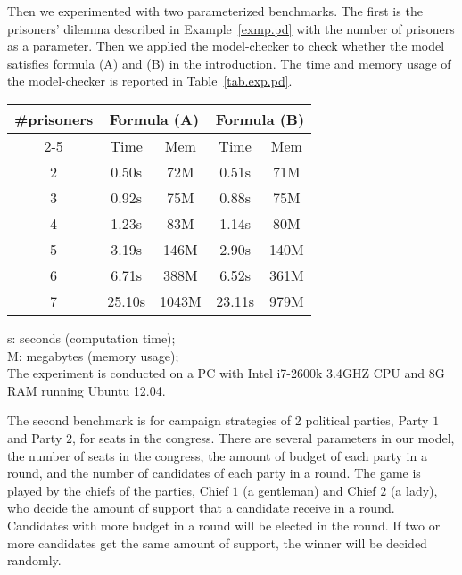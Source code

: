 \documentclass[11pt]{article}
\begin{document}
Then we experimented with two parameterized benchmarks.  
The first is the prisoners' dilemma described in Example~\ref{exmp.pd} 
with the number of prisoners as a parameter.  
Then we applied the model-checker to check whether the model  
satisfies formula (A) and (B) in the introduction.
The time and memory usage of the model-checker is reported in 
Table~\ref{tab.exp.pd}.
\begin{table*}[!th]
\caption{Experiment data for the prisoners' dilemma model}
\label{tab.exp.pd}
\begin{center}
\begin{tabular}{c||c|c||c|c} \hline
\multirow{2}{*}{\#prisoners}  &\multicolumn{2}{c||}{Formula (A)} & \multicolumn{2}{c}{Formula (B)}\\ \cline{2-5}
& Time & Mem  & Time & Mem\\ \hline
2 &0.50s &72M   &0.51s &71M \\
3 &0.92s &75M   &0.88s &75M \\
4 &1.23s &83M   &1.14s &80M \\
5 &3.19s &146M  &2.90s &140M \\
6 &6.71s &388M  &6.52s &361M \\
7 &25.10s&1043M &23.11s&979M \\ \hline
\end{tabular}
\hspace*{10mm}
\parbox{50mm}{
s: seconds (computation time); \\
M: megabytes (memory usage); \\[2mm]
The experiment is conducted on a PC with Intel i7-2600k 3.4GHZ CPU 
and 8G RAM running Ubuntu 12.04. 
}
\end{center}
\end{table*}

The second benchmark is for campaign strategies 
of 2 political parties, Party $1$ and Party $2$, for seats in 
the congress.  
There are several parameters in our model, 
the number of seats in the congress, 
the amount of budget of each party in a round, 
and the number of candidates of each party in a round. 
The game is played by the chiefs of the parties, 
Chief $1$ (a gentleman) and Chief $2$ (a lady), 
who decide the amount of support that 
a candidate receive in a round.   
Candidates with more budget in a round will be elected in the round. 
If two or more candidates get the same amount of support, 
the winner will be decided randomly.  
\end{document}
